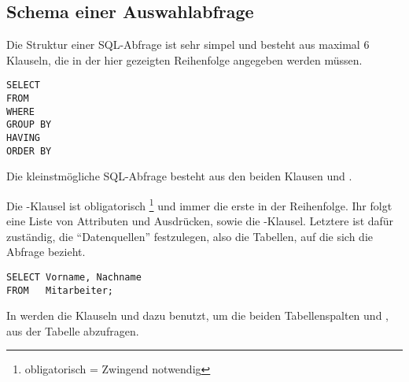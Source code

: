       \subsection{Schema einer Auswahlabfrage}
        Die Struktur einer SQL-Abfrage ist sehr simpel und besteht aus maximal 6 Klauseln, die in der hier gezeigten Reihenfolge angegeben werden müssen.
        \begin{lstlisting}[emph={WHERE,GROUP,BY,HAVING,ORDER}, emphstyle=\color{lightgray}, language=oracle_sql, label=sql01_01]
SELECT
FROM
WHERE
GROUP BY
HAVING
ORDER BY
        \end{lstlisting}
        \begin{merke}
          Die kleinstmögliche SQL-Abfrage besteht aus den beiden Klausen  und .
        \end{merke}

        Die -Klausel ist obligatorisch \footnote{obligatorisch = Zwingend notwendig} und immer die erste in der Reihenfolge. Ihr folgt eine Liste von Attributen und Ausdrücken, sowie die -Klausel. Letztere ist dafür zuständig, die \enquote{Datenquellen} festzulegen, also die Tabellen, auf die sich die Abfrage bezieht.
        \begin{lstlisting}[language=oracle_sql,caption={Eine einfache Auswahlabfrage in Oracle},label=sql01_02]
SELECT Vorname, Nachname
FROM   Mitarbeiter;
        \end{lstlisting}
        In  werden die Klauseln  und  dazu benutzt, um die beiden Tabellenspalten  und , aus der Tabelle  abzufragen.


